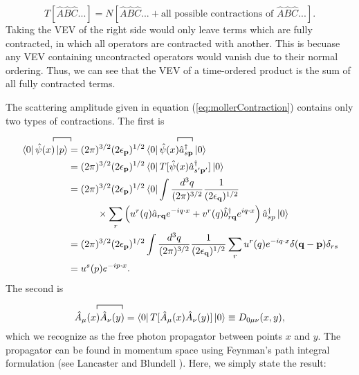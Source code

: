 \documentclass{article}
\begin{document}
\begin{equation}
    T[\hat{A}\hat{B}\hat{C}...]
    =
    N[\hat{A}\hat{B}\hat{C}...
    +
    \text{all possible contractions of }
    \hat{A}\hat{B}\hat{C}...].
\end{equation}
%
Taking the VEV of the right side would only leave terms which are fully contracted, in which all operators are contracted with another.  This is becuase any VEV containing uncontracted operators would vanish due to their normal ordering.  Thus, we can see that the VEV of a time-ordered product is the sum of all fully contracted terms.

The scattering amplitude given in equation (\ref{eq:mollerContraction}) contains only two types of contractions.  The first is

\begin{equation}
\begin{aligned}
    \contraction[1ex]
        {\bra{0}}{\hat{\psi}(x)}{}{\ket{p}}
    \bra{0}\hat{\psi}(x)\ket{p}
    &=
    \contraction[1ex]
        {(2\pi)^{3/2}(2\epsilon_\mathbf{p})^{1/2}\bra{0}}
        {\hat{\psi}(x)}{}{\hat{a}^\dag}
    (2\pi)^{3/2}(2\epsilon_\mathbf{p})^{1/2}
    \bra{0}\hat{\psi}(x)\hat{a}^\dag_{s\mathbf{p}}\ket{0}
    \\&=
    (2\pi)^{3/2}(2\epsilon_\mathbf{p})^{1/2}
    \bra{0}T[\hat{\psi}(x)\hat{a}^\dag_{s'\mathbf{p'}}]\ket{0}
    \\&=
    (2\pi)^{3/2}(2\epsilon_\mathbf{p})^{1/2}
    \bra{0}
    \int\frac{d^3q}{(2\pi)^{3/2}}
    \frac{1}{(2\epsilon_\mathbf{q})^{1/2}}
    \\&\quad\qquad\times
    \sum_{r} \left(
    u^{r}(q)\hat{a}_{r\mathbf{q}}e^{-iq\cdot x}
    +
    v^{r}(q)\hat{b}^\dag_{r\mathbf{q}}e^{iq\cdot x}
    \right)
    \hat{a}^\dag_{sp}
    \ket{0}
    \\&=
    (2\pi)^{3/2}(2\epsilon_\mathbf{p})^{1/2}
    \int\frac{d^3q}{(2\pi)^{3/2}}
    \frac{1}{(2\epsilon_\mathbf{q})^{1/2}}
    \sum_{r} 
    u^{r}(q)e^{-iq\cdot x}
    \delta(\mathbf{q-p})\delta_{rs}
    \\&=
    u^{s}(p)e^{-ip\cdot x}.
\end{aligned}
\end{equation}
%
The second is

\begin{equation}
    \contraction[1ex]
        {}{\hat{A}_\mu(x)}{}{\hat{A}_\nu(y)}
    \hat{A}_\mu(x)\hat{A}_\nu(y)
    =
    \bra{0}
    T[\hat{A}_\mu(x)\hat{A}_\nu(y)]
    \ket{0}
    \equiv
    D_{0\mu\nu}(x, y),
\end{equation}
%
which we recognize as the free photon propagator between points $x$ and $y$. The propagator can be found in momentum space using Feynman's path integral formulation (see Lancaster and Blundell \cite{Lancaster2014}).  Here, we simply state the result:
\end{document}
